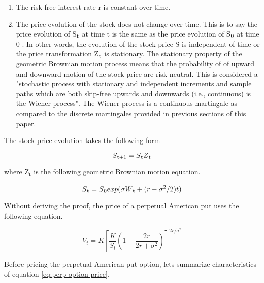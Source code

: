\documentclass{article}
\begin{document}
\begin{enumerate}
\item The risk-free interest rate r is constant over time.
\item The price evolution of the stock does not change over time. This is to say the price evolution of S$\textsubscript{t}$ at time t is the same as the price evolution of S$\textsubscript{0}$ at time 0 \cite{amer_opts}. In other words, the evolution of the stock price S is independent of time or the price transformation Z$\textsubscript{t}$ is stationary. The stationary property of the geometric Brownian motion process means that the probability of of upward and downward motion of the stock price are risk-neutral\cite{bro_mot}. This is considered a "stochastic process with stationary and independent increments and sample paths which are both skip-free upwards and downwards (i.e., continuous) is the Wiener process"\cite{amer_opts}. The Wiener process is a continuous martingale as compared to the discrete martingales provided in previous sections of this paper\cite{bro_mot}.
\end{enumerate}

The stock price evolution takes the following form

\begin{equation}
    S\textsubscript{t+1}=S\textsubscript{t}Z\textsubscript{t}
\end{equation}

where Z\textsubscript{t} is the following geometric Brownian motion equation.

\begin{equation}
    S\textsubscript{t}=S\textsubscript{0} exp( \sigma W\textsubscript{t} + (r - \sigma\textsuperscript{2}/2)t)
\end{equation}

Without deriving the proof, the price of a perpetual American put uses the following equation.

\begin{equation}
    V_{t} = K \left[ \frac{K}{S_{t}} \left( 1 - \frac{2r}{ 2r+\sigma^2 } \right) \right] ^{2r/\sigma^2 } \label{eq:perp-option-price}
\end{equation}

Before pricing the perpetual American put option, lets summarize characteristics of equation \ref{eq:perp-option-price}.
\end{document}
